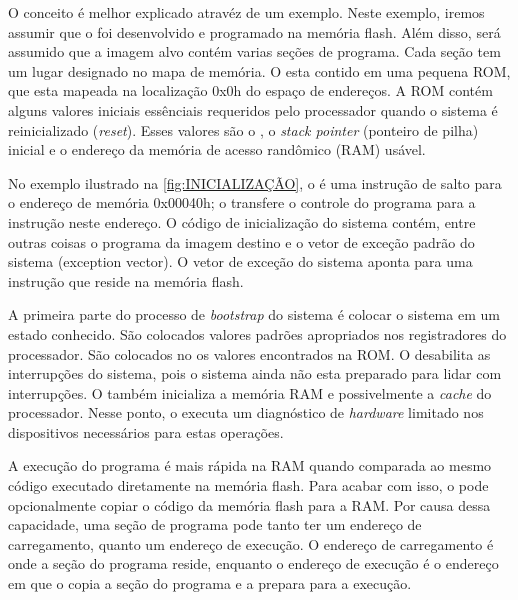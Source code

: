 O conceito é melhor explicado atravéz de um exemplo. Neste exemplo, iremos assumir que o \loader foi desenvolvido e programado na memória flash. Além disso, será assumido que a imagem alvo contém varias seções de programa. Cada seção tem um lugar designado no mapa de memória. O \resetv esta contido em uma pequena ROM, que esta mapeada na localização 0x0h do espaço de endereços. A ROM contém alguns valores iniciais essênciais requeridos pelo processador quando o sistema é reinicializado (\textit{reset}). Esses valores são o \resetv, o \textit{stack pointer} (ponteiro de pilha) inicial e o endereço da memória de acesso randômico (RAM) usável. 

No exemplo ilustrado na \autoref{fig:INICIALIZAÇÃO}, o \resetv é uma instrução de salto para o endereço de memória 0x00040h; o \resetv transfere o controle do programa para a instrução neste endereço. O código de inicialização do sistema contém, entre outras coisas o programa \loader da imagem destino e o vetor de exceção padrão do sistema (exception vector). O vetor de exceção do sistema aponta para uma instrução que reside na memória flash.

A primeira parte do processo de \textit{bootstrap} do sistema é colocar o sistema em um estado conhecido. São colocados valores padrões apropriados nos registradores do processador. São colocados no \stackp os valores encontrados na ROM. O \loader desabilita as interrupções do sistema, pois o sistema ainda não esta preparado para lidar com interrupções. O \loader também inicializa a memória RAM e possivelmente a \textit{cache} do processador. Nesse ponto, o \loader executa um diagnóstico de \textit{hardware} limitado nos dispositivos necessários para estas operações.

A execução do programa é mais rápida na RAM quando comparada ao mesmo código executado diretamente na memória flash. Para acabar com isso, o \loader pode opcionalmente copiar o código da memória flash para a RAM. Por causa dessa capacidade, uma seção de programa pode tanto ter um endereço de carregamento, quanto um endereço de execução. O endereço de carregamento é onde a seção do programa reside, enquanto o endereço de execução é o endereço em que o \loader copia a seção do programa e a prepara para a execução.

